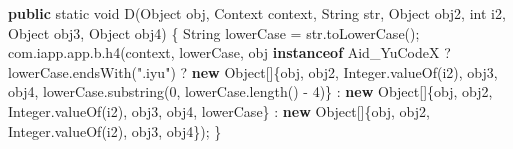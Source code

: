 \documentclass[
]{article}
\newenvironment{Shaded}{}{}
\newcommand{\BuiltInTok}[1]{\textcolor[rgb]{0.00,0.50,0.00}{#1}}
\newcommand{\DataTypeTok}[1]{\textcolor[rgb]{0.56,0.13,0.00}{#1}}
\newcommand{\DecValTok}[1]{\textcolor[rgb]{0.25,0.63,0.44}{#1}}
\newcommand{\FunctionTok}[1]{\textcolor[rgb]{0.02,0.16,0.49}{#1}}
\newcommand{\KeywordTok}[1]{\textcolor[rgb]{0.00,0.44,0.13}{\textbf{#1}}}
\newcommand{\NormalTok}[1]{#1}
\newcommand{\OperatorTok}[1]{\textcolor[rgb]{0.40,0.40,0.40}{#1}}
\newcommand{\StringTok}[1]{\textcolor[rgb]{0.25,0.44,0.63}{#1}}
\begin{document}
\begin{Shaded}
\begin{Highlighting}[]
    \KeywordTok{public} \DataTypeTok{static} \DataTypeTok{void} \FunctionTok{D}\OperatorTok{(}\BuiltInTok{Object}\NormalTok{ obj}\OperatorTok{,} \BuiltInTok{Context}\NormalTok{ context}\OperatorTok{,} \BuiltInTok{String}\NormalTok{ str}\OperatorTok{,} \BuiltInTok{Object}\NormalTok{ obj2}\OperatorTok{,} \DataTypeTok{int}\NormalTok{ i2}\OperatorTok{,} \BuiltInTok{Object}\NormalTok{ obj3}\OperatorTok{,} \BuiltInTok{Object}\NormalTok{ obj4}\OperatorTok{)} \OperatorTok{\{}
        \BuiltInTok{String}\NormalTok{ lowerCase }\OperatorTok{=}\NormalTok{ str}\OperatorTok{.}\FunctionTok{toLowerCase}\OperatorTok{();}
\NormalTok{        com}\OperatorTok{.}\FunctionTok{iapp}\OperatorTok{.}\FunctionTok{app}\OperatorTok{.}\FunctionTok{b}\OperatorTok{.}\FunctionTok{h4}\OperatorTok{(}\NormalTok{context}\OperatorTok{,}\NormalTok{ lowerCase}\OperatorTok{,}\NormalTok{ obj }\KeywordTok{instanceof}\NormalTok{ Aid\_YuCodeX }\OperatorTok{?}\NormalTok{ lowerCase}\OperatorTok{.}\FunctionTok{endsWith}\OperatorTok{(}\StringTok{".iyu"}\OperatorTok{)} \OperatorTok{?} \KeywordTok{new} \BuiltInTok{Object}\OperatorTok{[]\{}\NormalTok{obj}\OperatorTok{,}\NormalTok{ obj2}\OperatorTok{,} \BuiltInTok{Integer}\OperatorTok{.}\FunctionTok{valueOf}\OperatorTok{(}\NormalTok{i2}\OperatorTok{),}\NormalTok{ obj3}\OperatorTok{,}\NormalTok{ obj4}\OperatorTok{,}\NormalTok{ lowerCase}\OperatorTok{.}\FunctionTok{substring}\OperatorTok{(}\DecValTok{0}\OperatorTok{,}\NormalTok{ lowerCase}\OperatorTok{.}\FunctionTok{length}\OperatorTok{()} \OperatorTok{{-}} \DecValTok{4}\OperatorTok{)\}} \OperatorTok{:} \KeywordTok{new} \BuiltInTok{Object}\OperatorTok{[]\{}\NormalTok{obj}\OperatorTok{,}\NormalTok{ obj2}\OperatorTok{,} \BuiltInTok{Integer}\OperatorTok{.}\FunctionTok{valueOf}\OperatorTok{(}\NormalTok{i2}\OperatorTok{),}\NormalTok{ obj3}\OperatorTok{,}\NormalTok{ obj4}\OperatorTok{,}\NormalTok{ lowerCase}\OperatorTok{\}} \OperatorTok{:} \KeywordTok{new} \BuiltInTok{Object}\OperatorTok{[]\{}\NormalTok{obj}\OperatorTok{,}\NormalTok{ obj2}\OperatorTok{,} \BuiltInTok{Integer}\OperatorTok{.}\FunctionTok{valueOf}\OperatorTok{(}\NormalTok{i2}\OperatorTok{),}\NormalTok{ obj3}\OperatorTok{,}\NormalTok{ obj4}\OperatorTok{\});}
    \OperatorTok{\}}


\end{Highlighting}
\end{Shaded}
\end{document}
